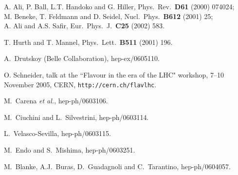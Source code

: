 \documentclass[12pt]{article}
\begin{document}
\begin{thebibliography}{999}
A. Ali, P. Ball, L.T. Handoko and G. Hiller,
{ Phys.\ Rev.}~{\bf D61} (2000) 074024;\\
M. Beneke, T. Feldmann and D. Seidel,
{ Nucl.\ Phys.}~{\bf B612} (2001) 25;\\
A. Ali and A.S. Safir,
{ Eur.\ Phys.\ J.}~{\bf C25} (2002) 583.

T. Hurth and T. Mannel,
{ Phys.\ Lett.}~{\bf B511} (2001) 196.

A.~Drutskoy (Belle Collaboration),
  hep-ex/0605110.

O. Schneider, talk at the ``Flavour in the era of the LHC" workshop,
7--10 November 2005, CERN, {\tt http://cern.ch/flavlhc}.

M.~Carena {\it et al.}, %
  hep-ph/0603106.
  
M.~Ciuchini and L.~Silvestrini,
  hep-ph/0603114.
  
L.~Velasco-Sevilla,
  hep-ph/0603115.
  
M.~Endo and S.~Mishima,
  hep-ph/0603251.
  
M.~Blanke, A.J.~Buras, D.~Guadagnoli and C.~Tarantino,
  hep-ph/0604057.
  

\end{thebibliography}
\end{document}
